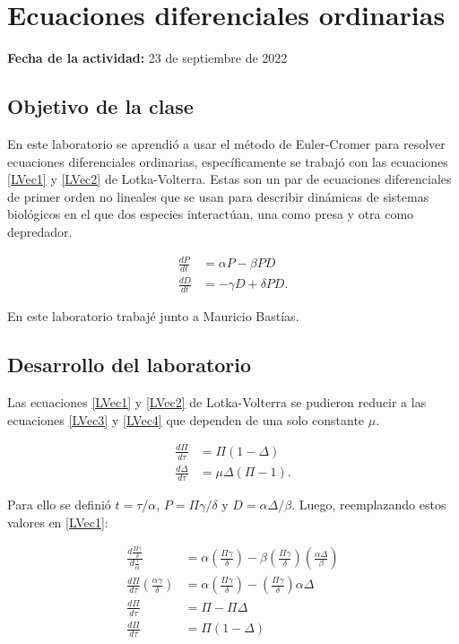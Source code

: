 \documentclass[../portafolio.tex]{subfiles}
\begin{document}
\section{Ecuaciones diferenciales ordinarias} 

\hfill \textbf{Fecha de la actividad:} 23 de septiembre de 2022

\medskip


\subsection{Objetivo de la clase}
En este laboratorio se aprendió a usar el método de Euler-Cromer para resolver ecuaciones diferenciales ordinarias, específicamente se trabajó con las ecuaciones \ref{LVec1} y \ref{LVec2} de Lotka-Volterra. Estas son un par de ecuaciones diferenciales de primer orden no lineales que se usan para describir dinámicas de sistemas biológicos en el que dos especies interactúan, una como presa y otra como depredador\cite{lotkavolterra}.




\begin{align}
    \frac{dP}{dt} &=\alpha P-\beta PD  \label{LVec1}\\
    \frac{dD}{dt} &= -\gamma D +\delta PD \label{LVec2}.
\end{align}

En este laboratorio trabajé junto a Mauricio Bastías.

\subsection{Desarrollo del laboratorio}

Las ecuaciones \ref{LVec1} y \ref{LVec2} de Lotka-Volterra se pudieron reducir a las ecuaciones \ref{LVec3} y \ref{LVec4} que dependen de una solo constante $\mu$. 

\begin{align}
    \frac{d\Pi}{d\tau} &= \Pi (1-\Delta) \label{LVec3} \\
    \frac{d\Delta}{d\tau} &= \mu \Delta(\Pi -1) \label{LVec4}.
\end{align}

Para ello se definió $t =\tau / \alpha$, $ P = \Pi \gamma / \delta $ y $D = \alpha \Delta / \beta$. Luego, reemplazando estos valores en \ref{LVec1}:

\begin{align*}
    \frac{d\frac{\Pi\gamma}{\delta}}{d\frac{\tau}{\alpha}} &= \alpha \left( \frac{\Pi \gamma}{\delta} \right) - \beta \left( \frac{\Pi \gamma}{\delta} \right) \left(  \frac{\alpha \Delta}{\beta}      \right) \\
    \frac{d\Pi}{d\tau}\left( \frac{\alpha \gamma}{\delta} \right) &= \alpha \left( \frac{\Pi \gamma}{\delta} \right) -  \left( \frac{\Pi \gamma}{\delta} \right)  \alpha \Delta \\
    \frac{d\Pi}{d\tau} &= \Pi - \Pi \Delta \\
    \frac{d\Pi}{d\tau} &= \Pi (1-\Delta)
\end{align*}
 
\end{document}
